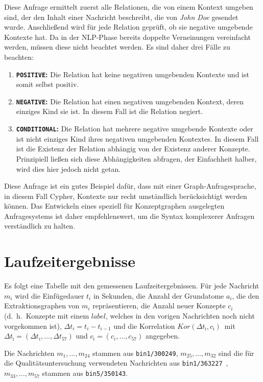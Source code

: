 \inputminted{cypher}{data/evaluation/personNegationAction.cql}
Diese Anfrage ermittelt zuerst alle Relationen, die von einem Kontext umgeben sind, der den Inhalt einer Nachricht beschreibt, die von \textit{John Doe} gesendet wurde.
Anschließend wird für jede Relation geprüft, ob sie negative umgebende Kontexte hat.
Da in der NLP-Phase bereits doppelte Verneinungen vereinfacht werden, müssen diese nicht beachtet werden.
Es sind daher drei Fälle zu beachten:
\begin{enumerate}
	\item \textbf{\texttt{POSITIVE}:}
		Die Relation hat keine negativen umgebenden Kontexte und ist somit selbst positiv.
	\item \textbf{\texttt{NEGATIVE}:}
		Die Relation hat einen negativen umgebenden Kontext, deren einziges Kind sie ist.
		In diesem Fall ist die Relation negiert.
	\item \textbf{\texttt{CONDITIONAL}:}
		Die Relation hat mehrere negative umgebende Kontexte oder ist nicht einziges Kind ihres negativen umgebenden Kontextes.
		In diesem Fall ist die Existenz der Relation abhängig von der Existenz anderer Konzepte.
		Prinzipiell ließen sich diese Abhängigkeiten abfragen, der Einfachheit halber, wird dies hier jedoch nicht getan.
\end{enumerate}
Diese Anfrage ist ein gutes Beispiel dafür, dass mit einer Graph-Anfragesprache, in diesem Fall Cypher, Kontexte nur recht umständlich berücksichtigt werden können.
Das Entwickeln eines speziell für Konzeptgraphen ausgelegten Anfragesystems ist daher empfehlenswert, um die Syntax komplexerer Anfragen verständlich zu halten.

\section{Laufzeitergebnisse}%
\label{sec:appendix:perf}

\def\kor{$Kor(\Delta t_{\hat{\imath}}, c_{\hat{\imath}})$}
Es folgt eine Tabelle mit den gemessenen Laufzeitergebnissen.
Für jede Nachricht $m_i$ wird die Einfügedauer $t_i$ in Sekunden, die Anzahl der Grundatome $a_i$, die den Extraktionsgraphen von $m_i$ repräsentieren, die Anzahl neuer Konzepte $c_i$ (d.~h.\ Konzepte mit einem $label$, welches in den vorigen Nachrichten noch nicht vorgekommen ist), $\Delta t_i = t_i - t_{i - 1}$ und die Korrelation \kor\ mit $\Delta t_{\hat{\imath}} = (\Delta t_i, \dots, \Delta t_{57})$ und $c_{\hat{\imath}} = (c_i, \dots, c_{57})$ angegeben.

Die Nachrichten $m_1, \dots, m_{24}$ stammen aus \texttt{bin1/300249}, $m_{25}, \dots, m_{32}$ sind die für die Qualitätsuntersuchung verwendeten Nachrichten aus \texttt{bin1/363227}~, $m_{33}, \dots, m_{57}$ stammen aus \texttt{bin5/350143}.
\csvautobooklongtable[
	separator=comma,
	table head=\toprule$i$ & $t_i$ & $a_i$ & $c_i$ & $\Delta t_i$ & \kor\\\midrule, %
]{data/evaluation/perfBig.csv}
